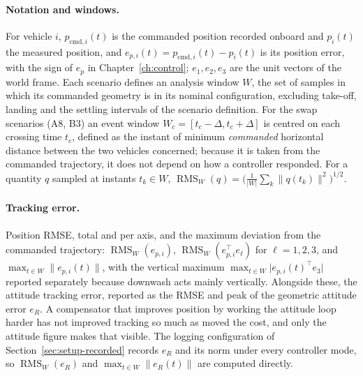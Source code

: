 \paragraph{Notation and windows.} For vehicle $i$, $p_{\mathrm{cmd},i}(t)$ is the commanded position
recorded onboard and $p_i(t)$ the measured position, and $e_{p,i}(t) = p_{\mathrm{cmd},i}(t) - p_i(t)$ is its
position error, with the sign of $e_p$ in Chapter~\ref{ch:control}; $e_1, e_2, e_3$ are the unit
vectors of the world frame.
Each scenario defines an analysis window $W$, the set of samples in which its commanded geometry is
in its nominal configuration, excluding take-off, landing and the settling intervals of the
scenario definition. For the swap scenarios (A8, B3) an event window
$W_c = [t_c - \Delta, t_c + \Delta]$ is centred on each crossing time $t_c$, defined as the instant
of minimum \emph{commanded} horizontal distance between the two vehicles concerned; because it is
taken from the commanded trajectory, it does not depend on how a controller responded.
For a quantity $q$ sampled at instants $t_k \in W$, $\operatorname{RMS}_W(q) =
\big(\tfrac{1}{\lvert W\rvert}\sum_{k} \lVert q(t_k)\rVert^2\big)^{1/2}$.

\paragraph{Tracking error.} Position RMSE, total and per axis, and the maximum deviation from the
commanded trajectory: $\operatorname{RMS}_W(e_{p,i})$, $\operatorname{RMS}_W(e_{p,i}^\top e_\ell)$ for
$\ell = 1,2,3$, and $\max_{t\in W}\lVert e_{p,i}(t)\rVert$, with the vertical maximum
$\max_{t\in W} \lvert e_{p,i}(t)^\top e_3\rvert$ reported separately because downwash acts mainly
vertically. Alongside these, the attitude tracking error, reported as the RMSE and peak
of the geometric attitude error $e_R$. A compensator that improves position by working the attitude
loop harder has not improved tracking so much as moved the cost, and only the attitude figure makes
that visible.
The logging configuration of Section~\ref{sec:setup-recorded} records $e_R$ and its norm under every
controller mode, so $\operatorname{RMS}_W(e_R)$ and $\max_{t\in W}\lVert e_R(t)\rVert$ are computed
directly.

